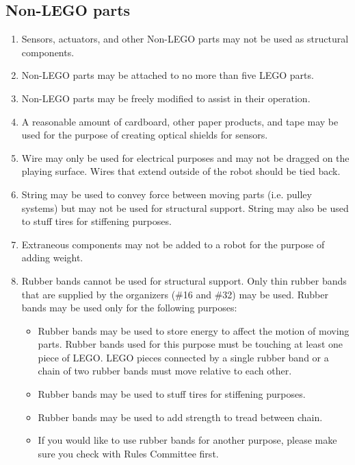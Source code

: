 \subsection{Non-LEGO parts}
\label{non-lego}
\begin{enumerate}

\item Sensors, actuators, and other Non-LEGO parts may not be used as structural
components.

\item Non-LEGO parts may be attached to no more than five LEGO parts.

\item Non-LEGO parts may be freely modified to assist in their operation.

\item A reasonable amount of cardboard, other paper products, and tape may be
used for the purpose of creating optical shields for sensors.

\item Wire may only be used for electrical purposes and may not be dragged on
the playing surface. Wires that extend outside of the robot should be tied back.

\item String may be used to convey force between moving parts (i.e. pulley
systems) but may not be used for structural support. String may also be used to
stuff tires for stiffening purposes.

\item Extraneous components may not be added to a robot for the purpose of
adding weight.

\item Rubber bands cannot be used for structural support.  Only thin rubber
bands that are supplied by the organizers (\#16 and \#32) may be used.  Rubber
bands may be used only for the following purposes:

\begin{itemize} 

\item Rubber bands may be used to store energy to affect the motion of moving
parts. Rubber bands used for this purpose must be touching at least one piece of
LEGO. LEGO pieces connected by a single rubber band or a chain of two rubber
bands must move relative to each other.

\item Rubber bands may be used to stuff tires for stiffening purposes.

\item Rubber bands may be used to add strength to tread between chain.

\item If you would like to use rubber bands for another purpose, please make
sure you check with Rules Committee first.

\end{itemize}
\end{enumerate}

